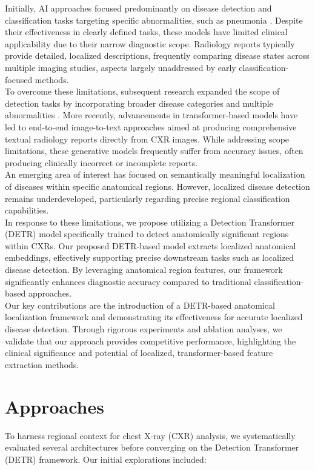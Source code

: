 \documentclass[10pt,twocolumn,letterpaper]{article}
\begin{document}
Initially, AI approaches focused predominantly on disease detection and classification tasks targeting specific abnormalities, such as pneumonia \cite{rajpurkar2017chexnet}. Despite their effectiveness in clearly defined tasks, these models have limited clinical applicability due to their narrow diagnostic scope. Radiology reports typically provide detailed, localized descriptions, frequently comparing disease states across multiple imaging studies, aspects largely unaddressed by early classification-focused methods.\\

To overcome these limitations, subsequent research expanded the scope of detection tasks by incorporating broader disease categories and multiple abnormalities \cite{wu2020comparison}. More recently, advancements in transformer-based models have led to end-to-end image-to-text approaches aimed at producing comprehensive textual radiology reports directly from CXR images. While addressing scope limitations, these generative models frequently suffer from accuracy issues, often producing clinically incorrect or incomplete reports.\\

An emerging area of interest has focused on semantically meaningful localization of diseases within specific anatomical regions. However, localized disease detection remains underdeveloped, particularly regarding precise regional classification capabilities.\\

In response to these limitations, we propose utilizing a Detection Transformer (DETR) model \cite{carion2020end} specifically trained to detect anatomically significant regions within CXRs. Our proposed DETR-based model extracts localized anatomical embeddings, effectively supporting precise downstream tasks such as localized disease detection. By leveraging anatomical region features, our framework significantly enhances diagnostic accuracy compared to traditional classification-based approaches.\\

Our key contributions are the introduction of a DETR-based anatomical localization framework and demonstrating its effectiveness for accurate localized disease detection. Through rigorous experiments and ablation analyses, we validate that our approach provides competitive performance, highlighting the clinical significance and potential of localized, transformer-based feature extraction methods.

\section{Approaches}
To harness regional context for chest X-ray (CXR) analysis, we systematically evaluated several architectures before converging on the Detection Transformer (DETR) framework. Our initial explorations included:
\end{document}
